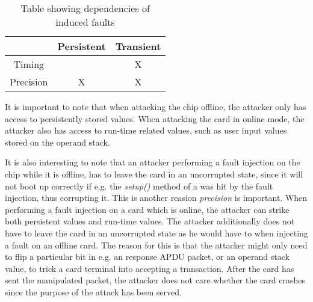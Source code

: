 \begin{table}[h!]
\centering
\begin{tabular}{|c|c|c|}
\hline  & Persistent & Transient \\ 
\hline Timing &  & X \\ 
\hline Precision & X & X \\ 
\hline 
\end{tabular} 
\caption{Table showing dependencies of induced faults}
\label{tab:dependencies}
\end{table}


It is important to note that when attacking the chip offline, the attacker only has access to persistently stored values. When attacking the card in online mode, the attacker also has access to run-time related values, such as user input values stored on the operand stack.

It is also interesting to note that an attacker performing a fault injection on the chip while it is offline, has to leave the card in an uncorrupted state, since it will not boot up correctly if e.g. the \textit{setup()} method of a \jc was hit by the fault injection, thus corrupting it. This is another reasion \textit{precision} is important. When performing a fault injection on a card which is online, the attacker can strike both persistent values and run-time values. The attacker additionally does not have to leave the card in an uncorrupted state as he would have to when injecting a fault on an offline card. The reason for this is that the attacker might only need to flip a particular bit in e.g. an response APDU packet, or an operand stack value, to trick a card terminal into accepting a transaction. After the card has sent the manipulated packet, the attacker does not care whether the card crashes since the purpose of the attack has been served.